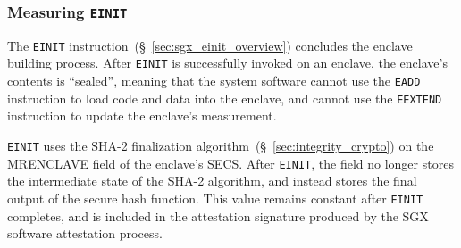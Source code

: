 \subsubsection{Measuring \texttt{EINIT}}


The \texttt{EINIT} instruction~(\S~\ref{sec:sgx_einit_overview}) concludes the
enclave building process. After \texttt{EINIT} is successfully invoked on an
enclave, the enclave's contents is ``sealed'', meaning that the system software
cannot use the \texttt{EADD} instruction to load code and data into the
enclave, and cannot use the \texttt{EEXTEND} instruction to update the
enclave's measurement.

\texttt{EINIT} uses the SHA-2 finalization
algorithm~(\S~\ref{sec:integrity_crypto}) on the MRENCLAVE field of the
enclave's SECS. After \texttt{EINIT}, the field no longer stores the
intermediate state of the SHA-2 algorithm, and instead stores the final output
of the secure hash function. This value remains constant after \texttt{EINIT}
completes, and is included in the attestation signature produced by the
SGX software attestation process.
